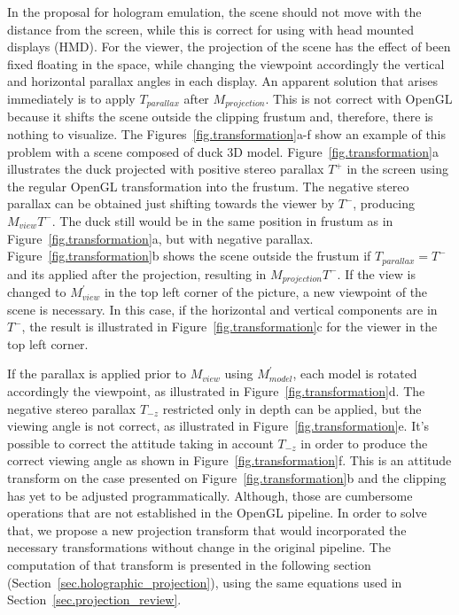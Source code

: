 In the proposal for hologram emulation, the scene should not move with the distance from the screen, while this is correct for using with head mounted displays (HMD). For the viewer, the projection of the scene has the effect of been fixed floating in the space, while changing the viewpoint accordingly the vertical and horizontal parallax angles in each display. An apparent solution that arises immediately is to apply $T_{parallax}$ after $M_{projection}$. This is not correct with OpenGL because it shifts the scene outside the clipping frustum and, therefore, there is nothing to visualize. The Figures~\ref{fig.transformation}a-f show an example of this problem with a scene composed of duck 3D model. Figure~\ref{fig.transformation}a illustrates the duck projected with positive stereo parallax $T^{+}$ in the screen using the regular OpenGL transformation into the frustum. The negative stereo parallax can be obtained just shifting towards the viewer by $T^{-}$, producing $M_{view}T^{-}$. The duck still would be in the same position in frustum as in Figure~\ref{fig.transformation}a, but with negative parallax. Figure~\ref{fig.transformation}b shows the scene outside the frustum if $T_{parallax} = T^{-}$ and its applied after the projection, resulting in $M_{projection}T^{-}$. If the view is changed to $M^{\prime}_{view}$ in the top left corner of the picture, a new viewpoint of the scene is necessary. In this case, if the horizontal and vertical components are in $T^{-}$, the result is illustrated in Figure~\ref{fig.transformation}c for the viewer in the top left corner.

If the parallax is applied prior to $M_{view}$ using $M^{\prime}_{model}$, each model is rotated accordingly the viewpoint, as illustrated in Figure~\ref{fig.transformation}d. The negative stereo parallax $T_{-z}$ restricted only in depth can be applied, but the viewing angle is not correct, as illustrated in Figure~\ref{fig.transformation}e. It's possible to correct the attitude taking in account $T_{-z}$ in order to produce the correct viewing angle as shown in Figure~\ref{fig.transformation}f. This is an attitude transform on the case presented on Figure~\ref{fig.transformation}b and the clipping has yet to be adjusted programmatically. Although, those are cumbersome operations that are not established in the OpenGL pipeline. In order to solve that, we propose a new projection transform that would incorporated the necessary transformations without change in the original pipeline. The computation of that transform is presented in the following section (Section~\ref{sec.holographic_projection}), using the same equations used in Section~\ref{sec.projection_review}.


